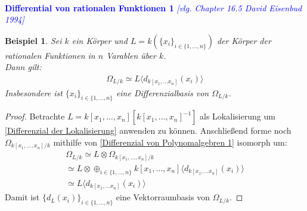 \documentclass[10pt,a4paper]{report}
\newcommand{\ModulsOfDifferenzials}{David Eisenbud 1994}
\newcounter{Aussage}[chapter]
\newtheorem{bsp}[Aussage]{Beispiel}
\newcommand{\divR}[2]{\Omega_{#1/#2}}
\newcommand{\divf}[1]{d_{#1}}
\newcommand{\tensor}[3]{#1 \otimes #3}
\newcommand{\lok}[2]{#1 [#2^{-1}]}
\newcommand{\Verz}[1]{\langle #1 \rangle}
\begin{document}
\ \\
\textcolor{blue}{\textbf{Differential von rationalen Funktionen 1} \textit{[vlg. Chapter 16.5 \ModulsOfDifferenzials]}}
\begin{bsp}\label{Differential von rationalen Funktionen 1}
Sei $k$ ein Körper und $L = k(\lbrace x_i \rbrace_{i \in \lbrace 1,\dots,n \rbrace})$ der Körper der rationalen Funktionen in $n$ Varablen über $k$.\\
Dann gilt:
\begin{gather*}
\divR{L}{k} \simeq L \Verz{\divf{k[x_1,\dots x_n]}(x_i)}
\end{gather*}
Insbesondere ist $\lbrace x_i \rbrace_{i \in \lbrace 1,\dots,n \rbrace}$ eine Differenzialbasis von $\divR{L}{k}$.
\end{bsp}
\begin{proof}
Betrachte $L = \lok{k[x_1,\dots,x_n]}{k[x_1,\dots,x_n]}$ als Lokalisierung um \cref{Differenzial der Lokalisierung} anwenden zu können. Anschließend forme noch $\divR{k[x_1,\dots,x_n]}{k}$ mithilfe von \cref{Differenzial von Polynomalgebren 1} isomorph um:
\begin{gather*}
\divR{L}{k} \simeq \tensor{L}{k[x_1,\dots,x_n]}{\divR{k[x_1,\dots,x_n]}{k}} \\
\simeq \tensor{L}{k[x_1,\dots,x_n]}{\oplus_{i \in \lbrace 1,\dots,n \rbrace} k[x_1,\dots,x_n] \Verz{\divf{k[x_1,\dots x_n]}(x_i)}} \\
\simeq L \Verz{\divf{k[x_1,\dots x_n]}(x_i)}
\end{gather*}
Damit ist $\lbrace \divf{L}(x_i) \rbrace_{i \in \lbrace 1,\dots,n \rbrace}$ eine Vektorraumbasis von $\divR{L}{k}$.
\end{proof}
\end{document}
